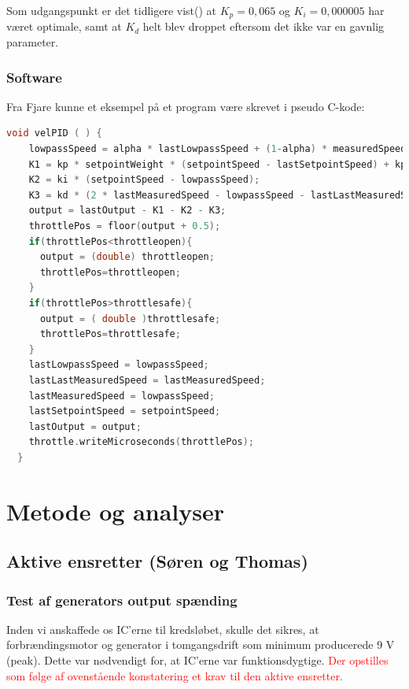 Som udgangspunkt er det tidligere vist(\autocite{pid1}) at $K_p=0,065$ og $K_i=0,000005$ har været optimale, samt at $K_d$ helt blev droppet eftersom det ikke var en gavnlig parameter.

\subsubsection{Software}
\label{sec:software}

Fra Fjare\autocite{pid1} kunne et eksempel på et program være skrevet i pseudo C-kode:
\begin{lstlisting}[language=C,basicstyle=\ttfamily]
  void velPID ( ) {
    lowpassSpeed = alpha * lastLowpassSpeed + (1-alpha) * measuredSpeed;
    K1 = kp * setpointWeight * (setpointSpeed - lastSetpointSpeed) + kp * (lastMeasuredSpeed - lowpassSpeed);
    K2 = ki * (setpointSpeed - lowpassSpeed);
    K3 = kd * (2 * lastMeasuredSpeed - lowpassSpeed - lastLastMeasuredSpeed);
    output = lastOutput - K1 - K2 - K3;
    throttlePos = floor(output + 0.5);
    if(throttlePos<throttleopen){
      output = (double) throttleopen;
      throttlePos=throttleopen;
    }
    if(throttlePos>throttlesafe){
      output = ( double )throttlesafe;
      throttlePos=throttlesafe;
    }
    lastLowpassSpeed = lowpassSpeed;
    lastLastMeasuredSpeed = lastMeasuredSpeed;
    lastMeasuredSpeed = lowpassSpeed;
    lastSetpointSpeed = setpointSpeed;
    lastOutput = output;
    throttle.writeMicroseconds(throttlePos);
  }
\end{lstlisting}

\clearpage
\section{Metode og analyser}
\label{sec:metode}

\subsection{Aktive ensretter (Søren og Thomas)}
\label{sec:aktive-ensr-soren}

\subsubsection{Test af generators output spænding}
\label{sec:test-af-generators}

Inden vi anskaffede os IC’erne til kredsløbet, skulle det sikres, at forbrændingsmotor og generator i tomgangsdrift som minimum producerede 9 V (peak). Dette var nødvendigt for, at IC’erne var funktionsdygtige. \textcolor{red}{Der opstilles som følge af ovenstående konstatering et krav til den aktive ensretter.}\\

